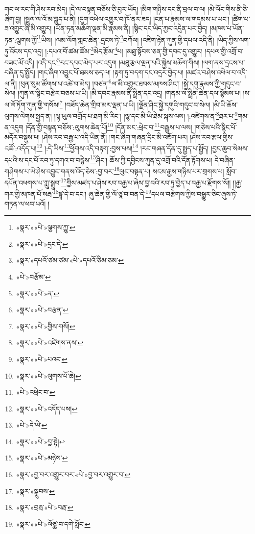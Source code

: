 གང་ལ་རང་གི་ཤེས་རབ་མེད། །དེ་ལ་བསྟན་བཅོས་ཅི་བྱར་ཡོད། །མིག་གཉིས་དང་ནི་བྲལ་བ་ལ། །མེ་ལོང་གིས་ནི་ཅི་ཞིག་བྱ། །སྦྲུལ་ལ་འོ་མ་བླུད་པ་ནི། །དུག་འཕེལ་འགྱུར་བ་ཁོ་ནར་ཟད། །ངན་པ་རྣམས་ལ་གདམས་པ་ཡང་། །ཚིག་པ་ཟ་འགྱུར་ཞི་མི་འགྱུར། །ཡོན་ཏན་མཆོག་ལྡན་མི་རྣམས་ནི། །སྙིང་དང་ཡིད་ཀྱང་འདྲེན་པར་བྱེད། །མཁས་པ་ཡོན་ཏན་:ལྕགས་ཀྱོ་\footnote{«སྣར་»«པེ་»ལྕགས་ཀྱུ་}ཡིས། །ལམ་ལོག་གླང་ཆེན་:དྲངས་ཏེ་\footnote{«སྣར་»«པེ་»དྲང་དེ་}བཀོལ། །འཇིག་རྟེན་ཀུན་གྱི་དཔལ་འདི་ནི། །ཡིད་ཀྱིས་ལག་ཏུ་འོངས་དང་འདྲ། །:དཔའ་བོ་ཚམ་ཚོམ་\footnote{«སྣར་»དཔའོ་ཙམ་ཙམ་«པེ་»དཔའོ་ཅིམ་ཅམ་}མེད་རྩོམ་\footnote{«པེ་»བརྩོམ་}པ། །མཐུ་སྟོབས་ཅན་གྱི་དབང་དུ་འགྱུར། །དཔལ་གྱི་འགྲོ་བ་བཟང་མོ་འདི། །འདི་དང་\footnote{«སྣར་»«པེ་»ན་}རང་དབང་མེད་པར་འདུག །མཐུ་རྩལ་ལྡན་པའི་སྐྱེས་མཆོག་གིས། །ལག་ནས་དྲངས་པ་བཞིན་དུ་སྤྱོད། །གང་ཞིག་འབྱུང་པོ་ཐམས་ཅད་ལ། །རྟག་ཏུ་བདག་དང་འདྲར་བྱེད་པ། །མཛའ་བཤེས་འཕེལ་བ་འདི་ལ་ནི། །ཕུན་སུམ་ཚོགས་པ་འཚེ་བ་མེད། །བཙན་\footnote{«སྣར་»«པེ་»བརྩན་}ལ་མི་འགྱུར་ཐབས་མཁས་ཤིང་། །སྐྱེ་དགུ་རྣམས་ཀྱི་གདུང་བ་སེལ། །ཀུན་ལ་སྙིང་བརྩེར་བཅས་པ་ཡི། །མི་དབང་རྣམས་ནི་སྤྲིན་དང་འདྲ། །གནམ་ལ་སྤྲིན་ཆེན་དལ་སྙོམས་པ། །ས་ལ་ལོ་ཏོག་ཀུན་གྱི་གསོས།\footnote{«སྣར་»«པེ་»གྱིས་གསོ།} །བཟོད་ཆེན་གྲིབ་མར་ལྡན་པ་ཡི། །ལྗོན་ཤིང་སྐྱེ་དགུའི་གདུང་བ་སེལ། །མི་ཡི་ཆོས་ལུགས་ལེགས་སྤྱད་ན། །ལྷ་ཡུལ་བགྲོད་པ་ཐག་མི་རིང་། །ལྷ་དང་མི་ཡི་ཐེམ་སྐས་ལས། །:འཛེགས་ན་\footnote{«སྣར་»«པེ་»འཛེགས་ནས་}ཐར་པ་\footnote{«སྣར་»«པེ་»པའང་}གམ་ན་འདུག །དོན་གྱི་བསྟན་བཅོས་:ལུགས་ཆེན་པོ།\footnote{«སྣར་»«པེ་»ལུགས་པོ་ཆེ།} །དོན་མང་:ཕྲེང་བ་\footnote{«པེ་»འཕྲེང་བ་}བརྒྱུས་པ་ལས། །གཅེས་པའི་སྙིང་པོ་མདོར་བསྡུས་པ། །ཤེས་རབ་བརྒྱ་པ་འདི་ཡིན་ནོ། །གང་ཞིག་གཞན་དྲིང་མི་འཇོག་པར། །ཤེས་རབ་རྩལ་གྱིས་འཚོ་:འདོད་པ།\footnote{«སྣར་»«པེ་»འདོད་པས།} །:དེ་ཡིས་\footnote{«པེ་»དེ་ཡི་}ཕྱོགས་འདི་བརྟག་:བྱས་པས།\footnote{«སྣར་»«པེ་»བྱ་སྟེ།} །རང་གཞན་དོན་དུ་སྤྱད་པ་སྤྱོད། །བྱང་ཆུབ་སེམས་དཔའི་ས་དང་པོ་རབ་ཏུ་དགའ་བ་བརྙེས་\footnote{«སྣར་»«པེ་»མཉེས་}ཤིང་། ཆོས་ཀྱི་དབྱིངས་ཀུན་དུ་འགྲོ་བའི་དོན་རྟོགས་པ། དེ་བཞིན་གཤེགས་པ་ཡེ་ཤེས་འབྱུང་གནས་འོད་ཅེས་:བྱ་བར་\footnote{«སྣར་»བྱ་བར་འགྱུར་བར་«པེ་»བྱ་བར་འགྱུར་བ་}ལུང་བསྟན་པ། སངས་རྒྱས་གཉིས་པར་གྲགས་པ། སློབ་དཔོན་འཕགས་པ་ཀླུ་སྒྲུབ་\footnote{«སྣར་»སྒྲུབས་}ཀྱིས་མཛད་པ་ཤེས་རབ་བརྒྱ་པ་ཞེས་བྱ་བའི་རབ་ཏུ་བྱེད་པ་བརྒྱ་པ་རྫོགས་སོ།། །།རྒྱ་གར་གྱི་མཁན་པོ་སརྦ་\footnote{«སྣར་»བྲརྦ་«པེ་»བརྦ་}ཛྙཱ་དེ་བ་དང་། ཞུ་ཆེན་གྱི་ལོ་ཙཱ་བ་བན་དེ་\footnote{«སྣར་»«པེ་»ལོཙྪ་བ་དགེ་སློང་}དཔལ་བརྩེགས་ཀྱིས་བསྒྱུར་ཅིང་ཞུས་ཏེ་གཏན་ལ་ཕབ་པའོ། ། 